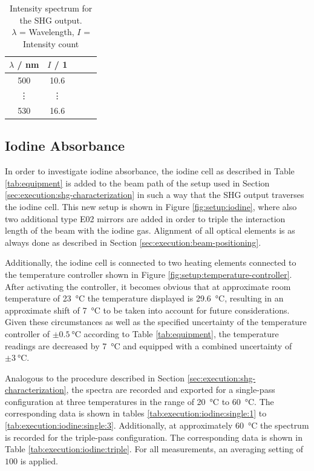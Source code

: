 \begin{table}[H]
    \centering
    \caption{Intensity spectrum for the SHG output. \\
    $\lambda$ = Wavelength, $I$ = Intensity count}
    \label{tab:execution:shg-characterization}
    \begin{tabular}{ccccc}
    \hline
    $\lambda$ / nm & $I$ / 1 \\ \hline
    500  & 10.6  \\
    \vdots & \vdots  \\
    530 & 16.6 \\ \hline
    \end{tabular}
\end{table}

\subsection{Iodine Absorbance}
\label{sec:execution:iodine}

In order to investigate iodine absorbance, the iodine cell as described in Table \ref{tab:equipment} is added to the beam path of the setup used in Section \ref{sec:execution:shg-characterization} in such a way that the SHG output traverses the iodine cell. This new setup is shown in Figure \ref{fig:setup:iodine}, where also two additional type E02 mirrors are added in order to triple the interaction length of the beam with the iodine gas. Alignment of all optical elements is as always done as described in Section \ref{sec:execution:beam-positioning}. 

Additionally, the iodine cell is connected to two heating elements connected to the temperature controller shown in Figure \ref{fig:setup:temperature-controller}. After activating the controller, it becomes obvious that at approximate room temperature of \SI{23}{\celsius} the temperature displayed is \SI{29.6}{\celsius}, resulting in an approximate shift of \SI{7}{\celsius} to be taken into account for future considerations. Given these circumstances as well as the specified uncertainty of the temperature controller of $\pm \SI{0.5}{\celsius}$ according to Table \ref{tab:equipment}, the temperature readings are decreased by \SI{7}{\celsius} and equipped with a combined uncertainty of $\pm \SI{3}{\celsius}$.

Analogous to the procedure described in Section \ref{sec:execution:shg-characterization}, the spectra are recorded and exported for a single-pass configuration at three temperatures in the range of \SI{20}{\celsius} to \SI{60}{\celsius}. The corresponding data is shown in tables \ref{tab:execution:iodine:single:1} to \ref{tab:execution:iodine:single:3}. Additionally, at approximately \SI{60}{\celsius} the spectrum is recorded for the triple-pass configuration. The corresponding data is shown in Table \ref{tab:execution:iodine:triple}. For all measurements, an averaging setting of $100$ is applied.

